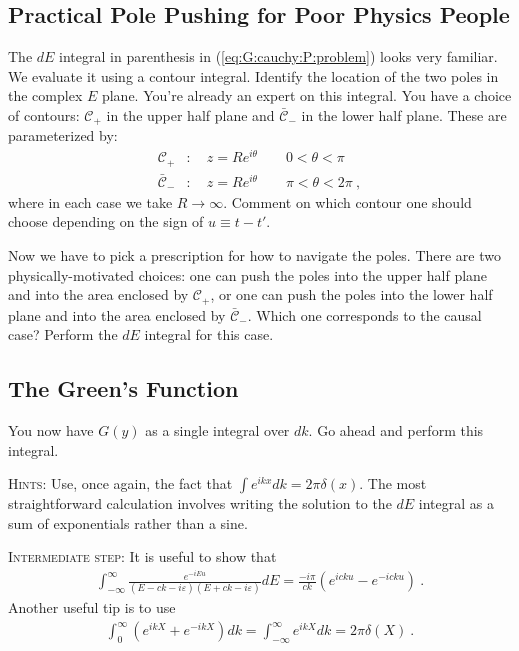 \documentclass[12pt]{article}
\numberwithin{equation}{section}    %
\begin{document}
\subsection{Practical Pole Pushing for Poor Physics People}

The $dE$ integral in parenthesis in (\ref{eq:G:cauchy:P:problem}) looks very familiar. We evaluate it using a contour integral. Identify the location of the two poles in the complex $E$ plane.
%
You're already an expert on this integral.
%
You have a choice of contours: $\mathcal C_+$ in the upper half plane and $\bar{\mathcal C}_-$ in the lower half plane. These are parameterized by:
\begin{align}
	\mathcal C_+ &: \quad z = Re^{i\theta} \qquad  0 < \theta < \pi \\
	\bar{\mathcal C}_- &: \quad z = Re^{i\theta} \qquad \pi < \theta < 2 \pi \ ,
\end{align}
where in each case we take $R\to \infty$.
Comment on which contour one should choose depending on the sign of $u\equiv t-t'$.

Now we have to pick a prescription for how to navigate the poles. There are two physically-motivated choices: one can push the poles into the upper half plane and into the area enclosed by $\mathcal C_+$, or one can push the poles into the lower half plane and into the area enclosed by $\bar{\mathcal C}_-$. Which one corresponds to the causal case? Perform the $dE$ integral for this case.


\subsection{The Green's Function}

You now have $G(y)$ as a single integral over $dk$. Go ahead and perform this integral. 

\textsc{Hints}: Use, once again, the fact that $\int e^{ikx} dk = 2\pi \delta(x)$. The most straightforward calculation involves writing the solution to the $dE$ integral as a sum of exponentials rather than a sine. 

\textsc{Intermediate step}: It is useful to show that
\begin{align}
	\int_{-\infty}^\infty \frac{e^{-iEu}}{(E-ck - i\varepsilon)(E+ck - i\varepsilon)} dE = 
	\frac{-i\pi}{ck} \left(e^{icku}-e^{-icku}\right) \ .
\end{align}
Another useful tip is to use
\begin{align}
	\int_0^\infty \left(e^{ikX} + e^{-ikX}\right) dk = 
	\int_{-\infty}^\infty e^{ikX} dk=
	2\pi \delta(X)
	 \ .
\end{align}
\end{document}
